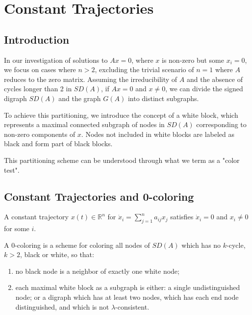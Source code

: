 \chapter{Constant Trajectories}
\section{Introduction}
In our investigation of solutions to $Ax = 0$, where $x$ is non-zero but some $x_i = 0$, we focus on cases where $n > 2$, excluding the trivial scenario of $n = 1$ where $A$ reduces to the zero matrix. Assuming the irreducibility of $A$ and the absence of cycles longer than 2 in $SD(A)$, if $Ax = 0$ and $x \neq 0$, we can divide the signed digraph $SD(A)$ and the graph $G(A)$ into distinct subgraphs.

To achieve this partitioning, we introduce the concept of a white block, which represents a maximal connected subgraph of nodes in $SD(A)$ corresponding to non-zero components of $x$. Nodes not included in white blocks are labeled as black and form part of black blocks.

This partitioning scheme can be understood through what we term as a "color test".

\section{Constant Trajectories and 0-coloring}
\begin{dfn}
	A constant trajectory $x(t) \in \mathbb{R}^n$ for $\dot{x}_i = \sum_{j=1}^n a_{ij}x_j$ satisfies $\dot{x}_i = 0$ and $x_i \neq 0$ for some $i$.
\end{dfn}
\begin{dfn}
	 A 0-coloring is a scheme for coloring all nodes of $SD(A)$ which has no $k$-cycle, $k > 2$, black or white, so that:
	\begin{enumerate}
		\item no black node is a neighbor of exactly one white node;
		\item each maximal white block as a subgraph is either: a single undistinguished node; or a digraph which has at least two nodes, which has each end node distinguished, and which is not $\lambda$-consistent.
	\end{enumerate}
\end{dfn}

